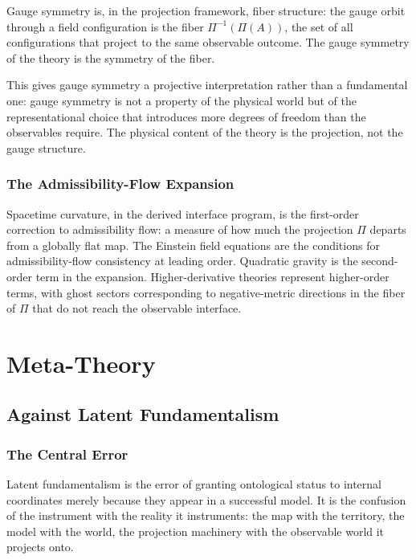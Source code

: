 \documentclass[12pt,a4paper]{book}
\theoremstyle{remark}
\theoremstyle{definition}
\begin{document}
Gauge symmetry is, in the projection framework, fiber structure: the
gauge orbit through a field configuration is the fiber $\Pi^{-1}(\Pi(A))$,
the set of all configurations that project to the same observable
outcome. The gauge symmetry of the theory is the symmetry of the fiber.

This gives gauge symmetry a projective interpretation rather than a
fundamental one: gauge symmetry is not a property of the physical world
but of the representational choice that introduces more degrees of freedom
than the observables require. The physical content of the theory is
the projection, not the gauge structure.

\section{The Admissibility-Flow Expansion}

Spacetime curvature, in the derived interface program, is the first-order
correction to admissibility flow: a measure of how much the projection
$\Pi$ departs from a globally flat map. The Einstein field equations are
the conditions for admissibility-flow consistency at leading order.
Quadratic gravity is the second-order term in the expansion. Higher-derivative
theories represent higher-order terms, with ghost sectors corresponding
to negative-metric directions in the fiber of $\Pi$ that do not reach
the observable interface.

\part{Meta-Theory}

\chapter{Against Latent Fundamentalism}

\section{The Central Error}

Latent fundamentalism is the error of granting ontological status to
internal coordinates merely because they appear in a successful model.
It is the confusion of the instrument with the reality it instruments:
the map with the territory, the model with the world, the projection
machinery with the observable world it projects onto.
\end{document}
